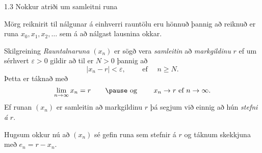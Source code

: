 %
\begin{frame}{1.3 Nokkur atriði um samleitni runa} 

Mörg reiknirit til nálgunar á einhverri rauntölu eru hönnuð þannig að 
reiknuð er runa $x_0,x_1,x_2,\dots$ sem á að nálgast lausnina
okkar.\pause

\begin{block}{Skilgreining}
{\it Rauntalnaruna} $(x_n)$ er sögð vera {\it samleitin} að {\it
  markgildinu} $r$ ef um sérhvert $\varepsilon>0$ gildir að til er
$N>0$ þannig að  
\begin{equation*}
	|x_n-r|<\varepsilon, \qquad \text{ ef } \quad n\geq N.
\end{equation*}\pause
Þetta er táknað með
\begin{equation*}
	\lim_{n\to \infty}x_n=r \qquad \pause\text{ og } \qquad  x_n\to r
	\text{ ef } n\to \infty.
\end{equation*} \pause
Ef runan $(x_n)$ er samleitin að markgildinu $r$ þá segjum við einnig
að hún {\it stefni á} $r$. 
\end{block}

\pause
Hugsum okkur nú að $(x_n)$ sé gefin runa sem stefnir á $r$ og táknum
skekkjuna með $e_n=r-x_n$.
\end{frame}
%

